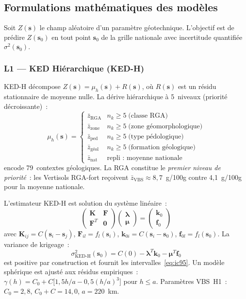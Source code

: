 \documentclass[10pt,a4paper,twocolumn]{article}
\newcommand{\bs}{\mathbf{s}}
\newcommand{\bK}{\mathbf{K}}
\newcommand{\blambda}{\boldsymbol{\lambda}}
\newcommand{\KED}{\text{KED-H}}
\begin{document}
	\subsection{Formulations mathématiques des modèles}
	\label{sec:modeles}
	
	Soit $Z(\bs)$ le champ aléatoire d'un paramètre géotechnique.
	L'objectif est de prédire $Z(\bs_0)$ en tout point $\bs_0$ de la
	grille nationale avec incertitude quantifiée~$\sigma^2(\bs_0)$.
	
	\subsubsection{L1 --- KED Hiérarchique (KED-H)}
	\label{subsec:ked}
	
	KED-H décompose $Z(\bs)=\mu_h(\bs)+R(\bs)$, où $R(\bs)$ est un
	résidu stationnaire de moyenne nulle. La dérive hiérarchique à
	5~niveaux (priorité décroissante)~:
	\begin{equation}
		\mu_h(\bs)=\begin{cases}
			\bar{z}_{\mathrm{RGA}}  & n_k\geq5\;\text{(classe RGA)} \\
			\bar{z}_{\mathrm{zone}} & n_k\geq5\;\text{(zone géomorphologique)} \\
			\bar{z}_{\mathrm{ped}}  & n_k\geq5\;\text{(type pédologique)} \\
			\bar{z}_{\mathrm{géol}} & n_k\geq5\;\text{(formation géologique)} \\
			\bar{z}_{\mathrm{nat}}  & \text{repli~: moyenne nationale}
		\end{cases}
		\label{eq:prior}
	\end{equation}
	encode 79~contextes géologiques. La RGA constitue le \emph{premier
		niveau de priorité}~: les Vertisols RGA-fort reçoivent
	$\bar{z}_{\mathrm{VBS}}\approx8{,}7$~g/100g contre
	4{,}1~g/100g pour la moyenne nationale.
	
	L'estimateur KED-H est solution du système linéaire~:
	\begin{equation}
		\begin{pmatrix}\bK & \mathbf{F}\\
			\mathbf{F}^T & \mathbf{0}\end{pmatrix}
		\begin{pmatrix}\blambda\\\bm{\mu}\end{pmatrix}=
		\begin{pmatrix}\mathbf{k}_0\\\mathbf{f}_0\end{pmatrix}
		\label{eq:ked_system}
	\end{equation}
	avec $\bK_{ij}=C(\bs_i-\bs_j)$, $\mathbf{F}_{il}=f_l(\bs_i)$,
	$\mathbf{k}_{0i}=C(\bs_i-\bs_0)$, $\mathbf{f}_{0l}=f_l(\bs_0)$.
	La variance de krigeage~:
	\begin{equation}
		\sigma^2_{\KED}(\bs_0)=C(0)
		-\blambda^T\mathbf{k}_0-\bm{\mu}^T\mathbf{f}_0
		\label{eq:ked_var}
	\end{equation}
	est positive par construction et fournit les intervalles~\eqref{eq:ic95}.
	Un modèle sphérique est ajusté aux résidus empiriques~:
	$\gamma(h)=C_0+C\bigl[1{,}5h/a-0{,}5(h/a)^3\bigr]$ pour $h\leq a$.
	Paramètres VBS~H1~: $C_0=2{,}8$, $C_0+C=14{,}0$, $a=220$~km.
	
\end{document}
